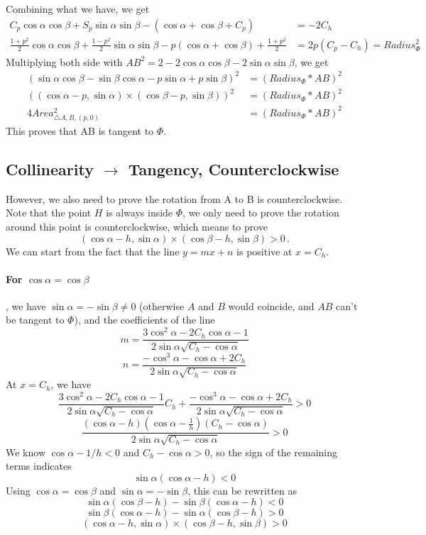 \documentclass[]{article}
\begin{document}
Combining what we have, we get
\begin{align*}
C_p\cos\alpha\cos\beta  + S_p\sin\alpha\sin\beta  - (\cos\alpha+\cos\beta+C_p) &= -2C_h \\
\frac{1+p^2}{2}\cos\alpha\cos\beta + \frac{1-p^2}{2}\sin\alpha\sin\beta - p(\cos\alpha+\cos\beta) + \frac{1+p^2}{2} &=2p(C_p - C_h) = Radius_\Phi^2
\end{align*}
Multiplying both side with $AB^2 = 2-2\cos\alpha\cos\beta-2\sin\alpha\sin\beta$, we get
\begin{align*}
(\sin\alpha\cos\beta-\sin\beta\cos\alpha-p\sin\alpha+p\sin\beta)^2 &= (Radius_\Phi * AB)^2\\
((\cos\alpha-p, \sin\alpha)\times(\cos\beta-p, \sin\beta))^2 &=(Radius_\Phi * AB)^2\\
4Area_{\triangle A,B,(p, 0)}^2 &= (Radius_\Phi * AB)^2
\end{align*}
This proves that AB is tangent to $\Phi$.

\subsection{Collinearity $\to$ Tangency, Counterclockwise}

However, we also need to prove the rotation from A to B is counterclockwise. Note that the point $H$ is always inside $\Phi$, we only need to prove the rotation around this point is counterclockwise, which means to prove
\[
(\cos\alpha-h, \sin\alpha)\times(\cos\beta-h, \sin\beta) > 0\,.
\]
We can start from the fact that the line $y = mx+n$ is positive at $x = C_h$.
\paragraph{For $\cos\alpha = \cos\beta$}, we have $\sin\alpha = -\sin\beta \neq 0$ (otherwise $A$ and $B$ would coincide, and $AB$ can't be tangent to $\Phi$), and the coefficients of the line
\[
m = \frac{3\cos^2\alpha-2C_h\cos\alpha-1}{2\sin\alpha\sqrt{C_h-\cos\alpha}}
\]
\[
n = \frac{-\cos^3\alpha-\cos\alpha+2C_h}{2\sin\alpha\sqrt{C_h-\cos\alpha}}
\]
At $x = C_h$, we have
\[
 \frac{3\cos^2\alpha-2C_h\cos\alpha-1}{2\sin\alpha\sqrt{C_h-\cos\alpha}} C_h + \frac{-\cos^3\alpha-\cos\alpha+2C_h}{2\sin\alpha\sqrt{C_h-\cos\alpha}} > 0
\]
\[
\frac{(\cos\alpha-h)\left(\cos\alpha-\frac{1}{h}\right)(C_h-\cos\alpha)}{2\sin\alpha\sqrt{C_h-\cos\alpha}} > 0
\]
We know $\cos\alpha-1/h < 0$ and $C_h-\cos\alpha > 0$, so the sign of the remaining terms indicates
\[
\sin\alpha(\cos\alpha-h) < 0
\]
Using $\cos\alpha = \cos\beta$ and  $\sin\alpha = -\sin\beta$, this can be rewritten as 
\[
\sin\alpha(\cos\beta-h) -\sin\beta(\cos\alpha-h) < 0
\]
\[
\sin\beta(\cos\alpha-h) - \sin\alpha(\cos\beta-h) > 0
\]
\[
(\cos\alpha-h, \sin\alpha)\times(\cos\beta-h, \sin\beta) > 0
\]
\end{document}
